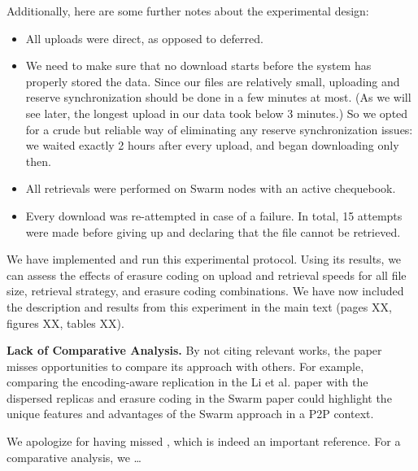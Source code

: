 \documentclass[11pt]{article}
\newcommand{\us}{\rm \setlength{\leftskip}{0.3cm} \setlength{\rightskip}{0.3cm}}
\newcommand{\them}{\it \setlength{\leftskip}{0cm} \setlength{\rightskip}{0cm}}
\begin{document}
Additionally, here are some further notes about the experimental design:

\begin{itemize}
\item All uploads were direct, as opposed to deferred.
\item We need to make sure that no download starts before the system has properly stored the data. Since our files are relatively small, uploading and reserve synchronization should be done in a few minutes at most. (As we will see later, the longest upload in our data took below 3 minutes.) So we opted for a crude but reliable way of eliminating any reserve synchronization issues: we waited exactly 2 hours after every upload, and began downloading only then.
\item All retrievals were performed on Swarm nodes with an active chequebook.
\item Every download was re-attempted in case of a failure. In total, 15 attempts were made before giving up and declaring that the file cannot be retrieved.
\end{itemize}

We have implemented and run this experimental protocol. Using its results, we can assess the effects of erasure coding on upload and retrieval speeds for all file size, retrieval strategy, and erasure coding combinations. We have now included the description and results from this experiment in the main text (pages XX, figures XX, tables XX).

\them

\textbf{Lack of Comparative Analysis.} By not citing relevant works, the paper misses opportunities to compare its approach with others. For example, comparing the encoding-aware replication in the Li et al. paper with the dispersed replicas and erasure coding in the Swarm paper could highlight the unique features and advantages of the Swarm approach in a P2P context.

\us

We apologize for having missed \citet{li2017enabling}, which is indeed an important reference. For a comparative analysis, we \ldots

\them \rm




\end{document}
